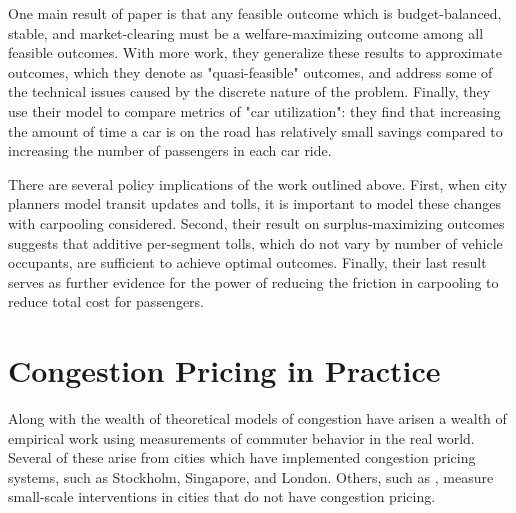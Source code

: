 \documentclass[JEL]{AEA}
\begin{document}
One main result of \cite{ostrovsky-2018} paper is that any feasible outcome which is budget-balanced, stable, and market-clearing must be a welfare-maximizing outcome among all feasible outcomes. With more work, they generalize these results to approximate outcomes, which they denote as "quasi-feasible" outcomes, and address some of the technical issues caused by the discrete nature of the problem. Finally, they use their model to compare metrics of "car utilization": they find that increasing the amount of time a car is on the road has relatively small savings compared to increasing the number of passengers in each car ride.

There are several policy implications of the work outlined above. First, when city planners model transit updates and tolls, it is important to model these changes with carpooling considered. Second, their result on surplus-maximizing outcomes suggests that additive per-segment tolls, which do not vary by number of vehicle occupants, are sufficient to achieve optimal outcomes. Finally, their last result serves as further evidence for the power of reducing the friction in carpooling to reduce total cost for passengers.



\section{Congestion Pricing in Practice}
\label{congestion-practice}

Along with the wealth of theoretical models of congestion have arisen a wealth of empirical work using measurements of commuter behavior in the real world. Several of these arise from cities which have implemented congestion pricing systems, such as Stockholm, Singapore, and London. Others, such as \cite{kreindler-2018}, measure small-scale interventions in cities that do not have congestion pricing.
\end{document}
